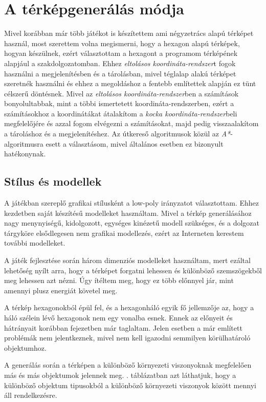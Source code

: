 \chapter{A térképgenerálás módja}
\label{chap:tervezes}

Mivel korábban már több játékot is készítettem ami négyzetrács alapú térképet használ, most szerettem volna megismerni, hogy a hexagon alapú térképek, hogyan készülnek, ezért választottam a hexagont a programom térképének alapjául a szakdolgozatomban. Ehhez \textit{eltolásos koordináta-rendszer}t fogok használni a megjelenítésben és a tárolásban, mivel téglalap alakú térképet szeretnék használni és ehhez a megoldáshoz a fentebb említettek alapján ez tünt célszerű döntésnek. Mivel az \textit{eltolásos koordináta-rendszer}ben a számítások bonyolultabbak, mint a többi ismertetett koordináta-rendszerben, ezért a számításokhoz a koordinátákat átalakítom a \textit{kocka koordináta-rendszer}beli megfelelőjére és azzal fogom elvégezni a számításokat, majd pedig visszaalakítom a tároláshoz és a megjelenítéshez. Az útkereső algoritmusok közül az \textit{A*}-algoritmusra esett a választásom, mivel általános esetben ez bizonyult hatékonynak.

\section{Stílus és modellek}

A játékban szereplő grafikai stílusként a low-poly irányzatot választottam. Ehhez kezdetben saját készítésű modelleket használtam. Mivel a térkép generálásához nagy meny\-nyi\-sé\-gű, kidolgozott, egységes kinézetű modell szükséges, és a dolgozat tárgyköre elsődlegesen nem grafikai modellezés, ezért az Interneten kerestem további modelleket.

A játék fejlesztése során három dimenziós modelleket használtam, mert ezáltal lehetőség nyílt arra, hogy a térképet forgatni lehessen és különböző szemszögekből meg lehessen azt nézni. Úgy ítéltem meg, hogy ez több előnnyel jár, mint amennyi plusz energiát követel meg.

A térkép hexagonokból épül fel, és a hexagonháló egyik fő jellemzője az, hogy a háló szélein lévő hexagonok nem egy vonalba esnek. Ennek az előnyeit és hátrányait korábban  fejezetben már taglaltam. Jelen esetben a már említett problémák nem jelentkeznek, mivel nem kell igazodni semmilyen körülhatároló objektumhoz.

A generálás során a térképen a különböző környezeti viszonyoknak megfelelően más és más objektumok jelennek meg. . táblázatban azt láthatjuk, hogy a különböző objektum tipusokból a különböző környezeti viszonyok között mennyi áll rendelkezésre.

